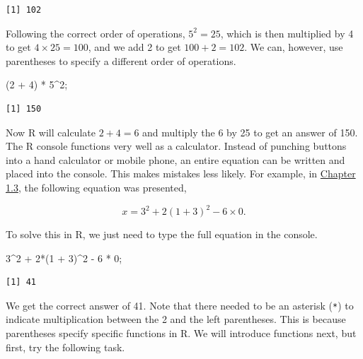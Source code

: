 \documentclass[
]{scrbook}
\newenvironment{Shaded}{\begin{snugshade}}{\end{snugshade}}
\newcommand{\DecValTok}[1]{\textcolor[rgb]{0.00,0.00,0.81}{#1}}
\newcommand{\NormalTok}[1]{#1}
\newcommand{\SpecialCharTok}[1]{\textcolor[rgb]{0.00,0.00,0.00}{#1}}
\begin{document}
\begin{verbatim}
[1] 102
\end{verbatim}

Following the correct order of operations, \(5^{2} = 25\), which is then multiplied by 4 to get \(4 \times 25 = 100\), and we add 2 to get \(100 + 2 = 102\).
We can, however, use parentheses to specify a different order of operations.

\begin{Shaded}
\begin{Highlighting}[]
\NormalTok{(}\DecValTok{2} \SpecialCharTok{+} \DecValTok{4}\NormalTok{) }\SpecialCharTok{*} \DecValTok{5}\SpecialCharTok{\^{}}\DecValTok{2}\NormalTok{;  }
\end{Highlighting}
\end{Shaded}

\begin{verbatim}
[1] 150
\end{verbatim}

Now R will calculate \(2 + 4 = 6\) and multiply the 6 by 25 to get an answer of 150.
The R console functions very well as a calculator.
Instead of punching buttons into a hand calculator or mobile phone, an entire equation can be written and placed into the console.
This makes mistakes less likely.
For example, in \protect\hyperlink{order-of-operations}{Chapter 1.3}, the following equation was presented,

\[x = 3^{2} + 2(1 + 3)^{2} - 6 \times 0.\]

To solve this in R, we just need to type the full equation in the console.

\begin{Shaded}
\begin{Highlighting}[]
\DecValTok{3}\SpecialCharTok{\^{}}\DecValTok{2} \SpecialCharTok{+} \DecValTok{2}\SpecialCharTok{*}\NormalTok{(}\DecValTok{1} \SpecialCharTok{+} \DecValTok{3}\NormalTok{)}\SpecialCharTok{\^{}}\DecValTok{2} \SpecialCharTok{{-}} \DecValTok{6} \SpecialCharTok{*} \DecValTok{0}\NormalTok{;}
\end{Highlighting}
\end{Shaded}

\begin{verbatim}
[1] 41
\end{verbatim}

We get the correct answer of 41.
Note that there needed to be an asterisk (\texttt{*}) to indicate multiplication between the 2 and the left parentheses.
This is because parentheses specify specific functions in R.
We will introduce functions next, but first, try the following task.
\end{document}
